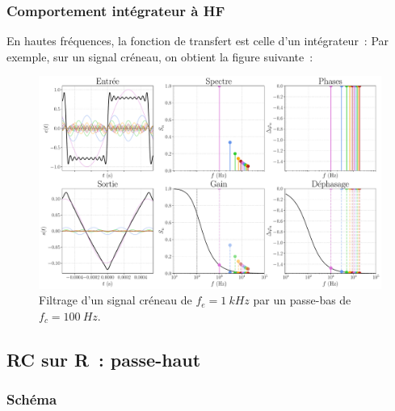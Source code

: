 \documentclass[../../main/main.tex]{subfiles}
\begin{document}
\subsubsection{Comportement intégrateur à HF}
En hautes fréquences, la fonction de transfert est celle d'un intégrateur~:
Par exemple, sur un signal créneau, on obtient la figure suivante~:
\begin{figure}[htbp]
	\centering
	\includegraphics[width=.95\linewidth]{fft_creneau_bth-fe=1000-fc=100}
	\caption{Filtrage d'un signal créneau de $f_e = \SI{1}{kHz}$ par un passe-bas
		de $f_c = \SI{100}{Hz}$.}
	\label{fig:creneauPB}
\end{figure}

\subsection{RC sur R~: passe-haut}
\subsubsection{Schéma}
\smallbreak
\noindent
\begin{minipage}{\linewidth}
	\begin{center}
		\vspace{-15pt}
	\end{center}
\end{minipage}
\end{document}

